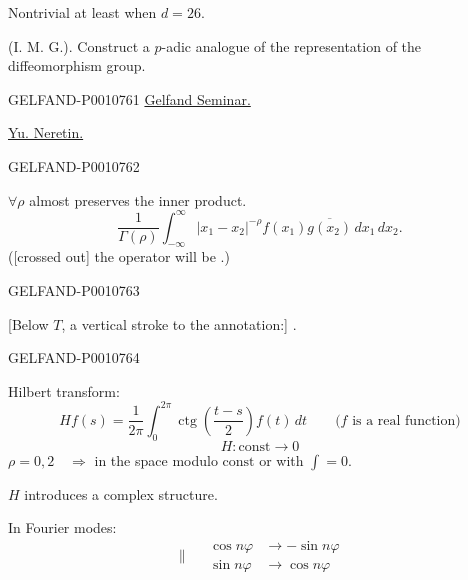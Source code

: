 Nontrivial at least when \uline{$d=26$}.

 (I. M. G.). Construct a $p$-adic analogue of the representation of the diffeomorphism group.


\begin{GelfandAdjacentEvidence}{GELFAND-P001076}{1}
\qquad\uline{Gelfand Seminar.}

\uline{Yu. Neretin.}
\end{GelfandAdjacentEvidence}
\begin{GelfandAdjacentEvidence}{GELFAND-P001076}{2}


$\forall\rho$ almost preserves the inner product.
\begin{equation*}
\frac{1}{\Gamma(\rho)}\int_{-\infty}^{\infty}
|x_1-x_2|^{-\rho}f(x_1)\overline{g(x_2)}\,dx_1\,dx_2.
\tag{1}
\end{equation*}
([crossed out] the operator will be .)
\end{GelfandAdjacentEvidence}
\begin{GelfandAdjacentEvidence}{GELFAND-P001076}{3}

[Below \(T\), a vertical stroke to the annotation:] .
\end{GelfandAdjacentEvidence}
\begin{GelfandAdjacentEvidence}{GELFAND-P001076}{4}


Hilbert transform:
\begin{equation*}
Hf(s)=\frac{1}{2\pi}\int_0^{2\pi}
\operatorname{ctg}\left(\frac{t-s}{2}\right)f(t)\,dt
\qquad\text{($f$ is a real function)}
\tag{2}
\end{equation*}
\begin{equation*}
H:\mathrm{const}\longrightarrow0
\end{equation*}
$\rho=0,2\quad\Rightarrow$ in the space modulo $\mathrm{const}$ or with $\int=0$.

$H$ introduces a complex structure.

In Fourier modes:
\begin{equation*}
\parallel\quad
\begin{aligned}
\cos n\varphi&\longrightarrow-\sin n\varphi\\
\sin n\varphi&\longrightarrow\cos n\varphi
\end{aligned}
\end{equation*}
\end{GelfandAdjacentEvidence}
